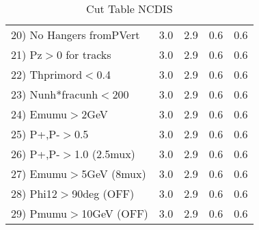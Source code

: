 \begin{table}[h!]
\begin{tabular}{||l||r|r|r|r||}
 20) No Hangers fromPVert &         3.0 &         2.9 &         0.6 &         0.6 \\
 21) Pz$>$0 for tracks    &         3.0 &         2.9 &         0.6 &         0.6 \\
 22) Thprimord$<$0.4      &         3.0 &         2.9 &         0.6 &         0.6 \\
 23) Nunh*fracunh$<$200   &         3.0 &         2.9 &         0.6 &         0.6 \\
 24) Emumu$>$2GeV         &         3.0 &         2.9 &         0.6 &         0.6 \\
 25) P+,P-$>$0.5          &         3.0 &         2.9 &         0.6 &         0.6 \\
 26) P+,P-$>$1.0 (2.5mux) &         3.0 &         2.9 &         0.6 &         0.6 \\
 27) Emumu$>$5GeV  (8mux) &         3.0 &         2.9 &         0.6 &         0.6 \\
 28) Phi12$>$90deg  (OFF) &         3.0 &         2.9 &         0.6 &         0.6 \\
 29) Pmumu$>$10GeV  (OFF) &         3.0 &         2.9 &         0.6 &         0.6 \\
 \hline
 \hline
 \end{tabular}
 \caption{Cut Table  NCDIS  }
 \label{tab-cut_ncdis}
 \end{table}
